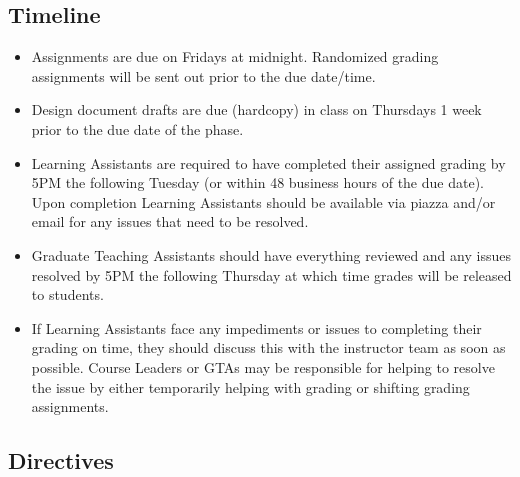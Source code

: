 \documentclass[12pt]{scrartcl}
\begin{document}
\subsection*{Timeline}

\begin{itemize}
  \item Assignments are due on Fridays at midnight.  
  Randomized grading assignments will be sent out prior to the due 
  date/time.
  
  \item Design document drafts are due (hardcopy) in class on 
    Thursdays 1 week prior to the due date of the phase.  
    
  \item Learning Assistants are required to have completed their assigned
    grading by 5PM the following Tuesday (or within 48 business hours of
    the due date).  Upon completion Learning
    Assistants should be available via piazza and/or email for any 
    issues that need to be resolved.
  \item Graduate Teaching Assistants should have everything reviewed and
    any issues resolved by 5PM the following Thursday at which time 
    grades will be released to students.
  \item If Learning Assistants face any impediments or issues to completing
    their grading on time, they should discuss this with the instructor
    team as soon as possible.  Course Leaders or GTAs may be 
    responsible for helping to resolve the issue by either 
    temporarily helping with grading or shifting grading assignments.  
\end{itemize}

\subsection*{Directives}
\end{document}
